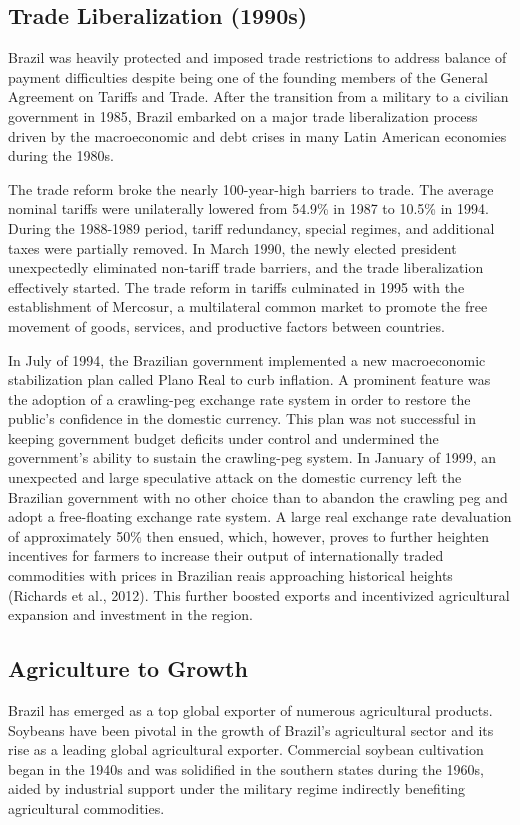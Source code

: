 \documentclass[11pt]{article}
\begin{document}
\subsection{Trade Liberalization (1990s)}
Brazil was heavily protected and imposed trade restrictions to address balance of payment difficulties despite being one of the founding members of the General Agreement on Tariffs and Trade. After the transition from a military to a civilian government in 1985, Brazil embarked on a major trade liberalization process driven by the macroeconomic and debt crises in many Latin American economies during the 1980s.

The trade reform broke the nearly 100-year-high barriers to trade. The average nominal tariffs were unilaterally lowered from 54.9\% in 1987 to 10.5\% in 1994. During the 1988-1989 period, tariff redundancy, special regimes, and additional taxes were partially removed. In March 1990, the newly elected president unexpectedly eliminated non-tariff trade barriers, and the trade liberalization effectively started. The trade reform in tariffs culminated in 1995 with the establishment of Mercosur, a multilateral common market to promote the free movement of goods, services, and productive factors between countries.

In July of 1994, the Brazilian government implemented a new macroeconomic stabilization plan called Plano Real to curb inflation. A prominent feature was the adoption of a crawling-peg exchange rate system in order to restore the public's confidence in the domestic currency. This plan was not successful in keeping government budget deficits under control and undermined the government's ability to sustain the crawling-peg system. In January of 1999, an unexpected and large speculative attack on the domestic currency left the Brazilian government with no other choice than to abandon the crawling peg and adopt a free-floating exchange rate system. A large real exchange rate devaluation of approximately 50\% then ensued, which, however, proves to further heighten incentives for farmers to increase their output of internationally traded commodities with prices in Brazilian reais approaching historical heights (Richards et al., 2012). This further boosted exports and incentivized agricultural expansion and investment in the region.

\subsection{Agriculture to Growth}
\label{sec:agtogrowth}
Brazil has emerged as a top global exporter of numerous agricultural products. Soybeans have been pivotal in the growth of Brazil's agricultural sector and its rise as a leading global agricultural exporter. Commercial soybean cultivation began in the 1940s and was solidified in the southern states during the 1960s, aided by industrial support under the military regime indirectly benefiting agricultural commodities.
\end{document}
